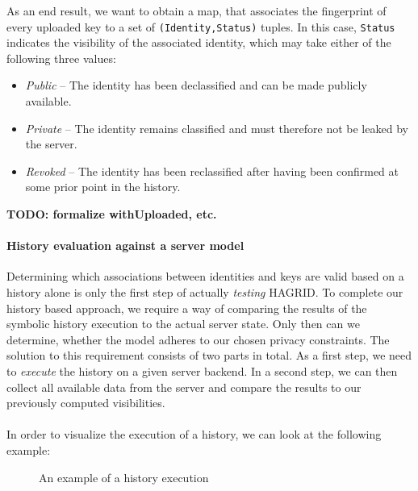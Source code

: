 As an end result, we want to obtain a map, that associates the fingerprint of every uploaded key to a set of \texttt{(Identity,Status)} tuples. In this case, \texttt{Status} indicates the visibility of the associated identity, which may take either of the following three values: 
\begin{itemize}
    \item \emph{Public} -- The identity has been declassified and can be made publicly available.
    \item \emph{Private} -- The identity remains classified and must therefore not be leaked by the server.
    \item \emph{Revoked} -- The identity has been reclassified after having been confirmed at some prior point in the history.
\end{itemize}

\textbf{TODO: formalize withUploaded, etc. }

\paragraph{History evaluation against a server model}
Determining which associations between identities and keys are valid based on a history alone is only the first step of actually \emph{testing} HAGRID. To complete our history based approach, we require a way of comparing the results of the symbolic history execution to the actual server state. Only then can we determine, whether the model adheres to our chosen privacy constraints.
The solution to this requirement consists of two parts in total. As a first step, we need to \emph{execute} the history on a given server backend. In a second step, we can then collect all available data from the server and compare the results to our previously computed visibilities. 
\\ \\
In order to visualize the execution of a history, we can look at the following example: 
\begin{figure}[H]
    \label{fig:history}
    \centering
    \caption{An example of a history execution}
\end{figure}

